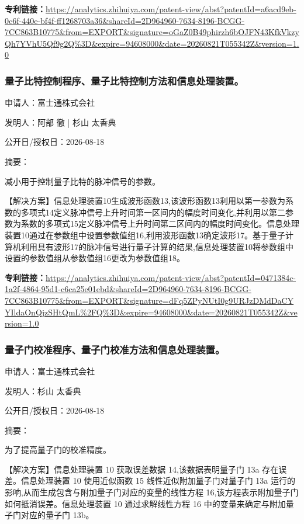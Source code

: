 \documentclass[12pt,a4paper]{ctexart}
\begin{document}
\noindent\textbf{专利链接：}\url{https://analytics.zhihuiya.com/patent-view/abst?patentId=a6acd9eb-0c6f-440e-bf4f-ff1268703a36&shareId=2D964960-7634-8196-BCGG-7CC863B10775&from=EXPORT&signature=oGaZ0B49phirzh6bOJFN43KfkVkzyQh7YVhU5Qf9g2Q%3D&expire=94608000&date=20260821T055342Z&version=1.0}

\subsubsection{ 量子比特控制程序、量子比特控制方法和信息处理装置。 }

申请人：富士通株式会社

发明人：阿部 徹 | 杉山 太香典

公开日/授权日：2026-08-18

摘要：

减小用于控制量子比特的脉冲信号的参数。 

 【解决方案】信息处理装置10生成波形函数13,该波形函数13利用以第一参数为系数的多项式14定义脉冲信号上升时间第一区间内的幅度时间变化,并利用以第二参数为系数的多项式15定义脉冲信号上升时间第二区间内的幅度时间变化。信息处理装置10通过在参数组中设置参数值组16,利用波形函数13确定波形17。基于量子计算机利用具有波形17的脉冲信号进行量子计算的结果,信息处理装置10将参数组中设置的参数值组从参数值组16更改为参数值组18。

\noindent\textbf{专利链接：}\url{https://analytics.zhihuiya.com/patent-view/abst?patentId=0471384c-1a2f-4864-95d1-c6ca25e01ebd&shareId=2D964960-7634-8196-BCGG-7CC863B10775&from=EXPORT&signature=dFq5ZPyNUtI0g9URJzDMdDaCYYIldaOnQjzSHtQmL%2FQ%3D&expire=94608000&date=20260821T055342Z&version=1.0}

\subsubsection{ 量子门校准程序、量子门校准方法和信息处理装置。 }

申请人：富士通株式会社

发明人：杉山 太香典

公开日/授权日：2026-08-18

摘要：

为了提高量子门的校准精度。 

 【解决方案】信息处理装置 10 获取误差数据 14,该数据表明量子门 13a 存在误差。信息处理装置 10 使用近似函数 15 线性近似附加量子门对量子门 13a 运行的影响,从而生成包含与附加量子门对应的变量的线性方程 16,该方程表示附加量子门如何抵消误差。信息处理装置 10 通过求解线性方程 16 中的变量来确定与附加量子门对应的量子门 13b。
\end{document}

